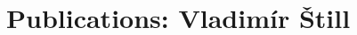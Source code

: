 \documentclass[11pt,a4paper]{article}
\begin{document}
\section{Publications: Vladimír Štill}
\let\section=\subsection
\let\subsection=\subsubsection

\end{document}
